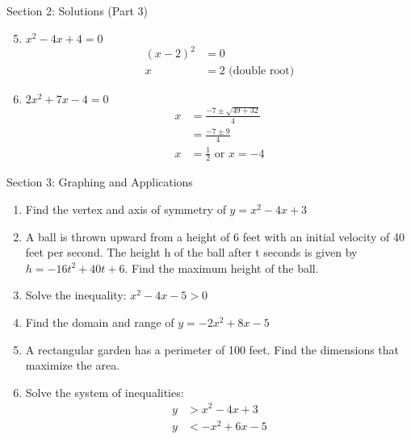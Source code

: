 \documentclass[aspectratio=169]{beamer}
\begin{document}
\begin{frame}{Section 2: Solutions (Part 3)}
    \begin{tcolorbox}[colback=lightgray,colframe=accent,title=Detailed Solutions (Continued)]
        \footnotesize
        \begin{enumerate}
            \setcounter{enumi}{4}
            \item $x^2 - 4x + 4 = 0$
            \begin{align*}
                (x - 2)^2 &= 0 \\
                x &= 2 \text{ (double root)}
            \end{align*}
            
            \item $2x^2 + 7x - 4 = 0$
            \begin{align*}
                x &= \frac{-7 \pm \sqrt{49 + 32}}{4} \\
                &= \frac{-7 \pm 9}{4} \\
                x &= \frac{1}{2} \text{ or } x = -4
            \end{align*}
        \end{enumerate}
    \end{tcolorbox}
\end{frame}

\begin{frame}{Section 3: Graphing and Applications}
    \begin{tcolorbox}[colback=lightgray,colframe=primary,title=Practice Problems]
        \footnotesize
        \begin{enumerate}
            \setlength{\itemsep}{0.5em}
            \item Find the vertex and axis of symmetry of $y = x^2 - 4x + 3$
            \item A ball is thrown upward from a height of 6 feet with an initial velocity of 40 feet per second. The height h of the ball after t seconds is given by $h = -16t^2 + 40t + 6$. Find the maximum height of the ball.
            \item Solve the inequality: $x^2 - 4x - 5 > 0$
            \item Find the domain and range of $y = -2x^2 + 8x - 5$
            \item A rectangular garden has a perimeter of 100 feet. Find the dimensions that maximize the area.
            \item Solve the system of inequalities:
            \begin{align*}
                y &> x^2 - 4x + 3 \\
                y &< -x^2 + 6x - 5
            \end{align*}
        \end{enumerate}
    \end{tcolorbox}
\end{frame}
\end{document}

